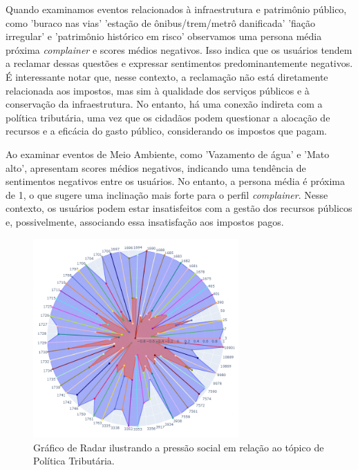 Quando examinamos eventos relacionados à infraestrutura e patrimônio público, como 'buraco nas vias' 'estação de ônibus/trem/metrô danificada' 'fiação irregular' e 'patrimônio histórico em risco' observamos uma persona média próxima \textit{complainer} e scores médios negativos. Isso indica que os usuários tendem a reclamar dessas questões e expressar sentimentos predominantemente negativos. É interessante notar que, nesse contexto, a reclamação não está diretamente relacionada aos impostos, mas sim à qualidade dos serviços públicos e à conservação da infraestrutura. No entanto, há uma conexão indireta com a política tributária, uma vez que os cidadãos podem questionar a alocação de recursos e a eficácia do gasto público, considerando os impostos que pagam.

Ao examinar eventos de Meio Ambiente, como 'Vazamento de água' e 'Mato alto', apresentam scores médios negativos, indicando uma tendência de sentimentos negativos entre os usuários. No entanto, a persona média é próxima de 1, o que sugere uma inclinação mais forte para o perfil \textit{complainer}. Nesse contexto, os usuários podem estar insatisfeitos com a gestão dos recursos públicos e, possivelmente, associando essa insatisfação aos impostos pagos.

\begin{figure}[htb]
	\centering
	\includegraphics[width=0.7\textwidth]{images/social_barometer_taxes.png}
	\caption{Gráfico de Radar ilustrando a pressão social em relação ao tópico de Política Tributária.}
	\label{fig:social_barometer_taxes}
\end{figure}

